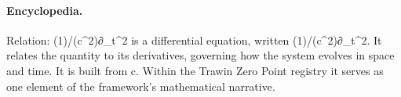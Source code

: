 \paragraph{Encyclopedia.}
Relation: (1)/(c\textasciicircum{}2)∂\_t\textasciicircum{}2 is a differential equation, written (1)/(c\textasciicircum{}2)∂\_t\textasciicircum{}2. It relates the quantity to its derivatives, governing how the system evolves in space and time. It is built from c. Within the Trawin Zero Point registry it serves as one element of the framework's mathematical narrative.
